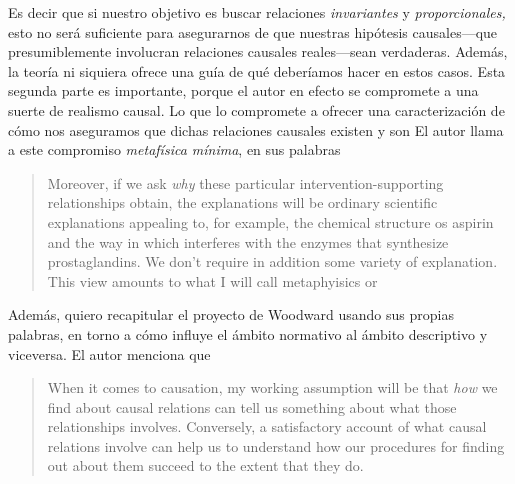 Es decir que si nuestro objetivo es buscar relaciones
\emph{invariantes} y \emph{proporcionales,} esto no será
suficiente para asegurarnos de que nuestras hipótesis
causales---que presumiblemente involucran relaciones
causales reales---sean verdaderas. Además, la teoría ni
siquiera ofrece una guía de qué deberíamos hacer en estos
casos. Esta segunda parte es importante, porque el autor en
efecto se compromete a una suerte de realismo causal. Lo
que lo compromete a ofrecer una caracterización de cómo nos
aseguramos que dichas relaciones causales existen y son
 El autor llama a este compromiso
\emph{metafísica mínima}, en sus palabras


\begin{quote}

  Moreover, if we ask \emph{why} these particular
  intervention-supporting relationships obtain, the
  explanations will be ordinary scientific explanations
  appealing to, for example, the chemical structure os
  aspirin and the way in which interferes with the enzymes
  that synthesize prostaglandins. We don't require in
  addition some variety of  explanation.
  This view amounts to what I will call 
  metaphyisics or 
  \parencite[p.~7]{caushuman} 

\end{quote}


Además, quiero recapitular el proyecto de Woodward usando
sus propias palabras, en torno a cómo influye el ámbito
normativo al ámbito descriptivo y viceversa. El autor
menciona que

  \begin{quote}
    When it comes to causation, my working assumption will
    be that \emph{how} we find about causal relations can
    tell us something about what those relationships
    involves. Conversely, a satisfactory account of what
    causal relations involve can help us to understand how
    our procedures for finding out about them succeed to the
    extent that they do. 
    \parencite[Énfasis en el original,~][p.~10]{caushuman} 
  \end{quote}


